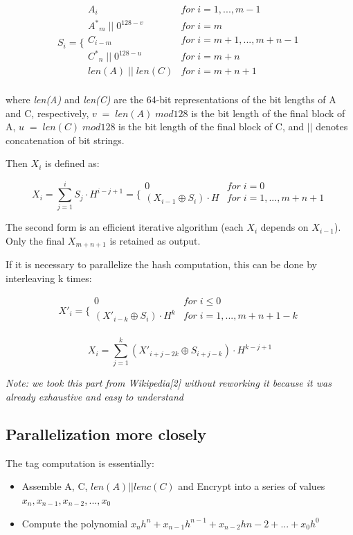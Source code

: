 \documentclass[11pt]{article}
\begin{document}
$$ S_i =
\Bigg \{
\begin{array}{ll}
A_i & for\;i = 1,...,m-1 \\
{A^*}_m\;||\;0^{128-v} & for\;i = m \\
C_{i-m} & for\;i = m+1,...,m+n-1 \\
{C^*}_n\;||\;0^{128-u} & for\;i = m+n \\
len(A)\;||\;len(C) & for\;i = m+n+1\\
\end{array}
$$

where {\em len(A)} and {\em len(C)} are the 64-bit representations of the bit lengths of A and C, respectively, $v\;=\;len(A)\;mod 128 $ is the bit length of the final block of A, $u\;=\;len(C)\;mod 128$ is the bit length of the final block of C, and $||$ denotes concatenation of bit strings.

Then $X_i$ is defined as:

$$ X_i = \sum_{j=1}^i S_j\cdot H^{i-j+1} =
\Bigg \{
\begin{array}{ll}
0 & for\;i = 0 \\
(X_{i-1} \oplus S_i)\cdot H & for\;i = 1,...,m+n+1 \\
\end{array}
$$

The second form is an efficient iterative algorithm (each $X_i$ depends on $X_{i-1}$). Only the final $X_{m+n+1}$ is retained as output.

If it is necessary to parallelize the hash computation, this can be done by interleaving k times:

$$ X'_i =
\Bigg \{
\begin{array}{ll}
0 & for\;i \leq 0 \\
(X'_{i-k} \oplus S_i)\cdot H^k & for\;i = 1,...,m+n+1-k \\
\end{array}
$$

$$ X_i = \sum_{j=1}^k (X'_{i+j-2k} \oplus S_{i+j-k}) \cdot H^{k-j+1} $$

{\em Note: we took this part from Wikipedia[2] without reworking it because it was already exhaustive and easy to understand}

\subsection{Parallelization more closely}
The tag computation is essentially:

\begin{itemize}
  \item Assemble A, C, $ len(A) || lenc(C) $ and Encrypt into a series of values $ x_n, x_{n-1}, x_{n-2},...,x_0 $
  \item Compute the polynomial $ x_n h^n + x_{n-1} h^{n-1} + x_{n-2} h{n-2} + ... + x_0 h^0 $
\end{itemize}
\end{document}
